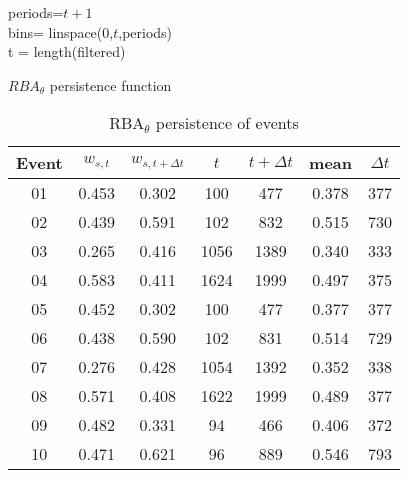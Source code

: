 \begin{algorithm}[!htbp] 
\SetAlgoLined
{}
periods=$t+1$ \\
bins= linspace(0,$t$,periods)  \\
t = length(filtered) \\
\caption{$RBA_\theta$ persistence function}
 \label{algo3}
\end{algorithm}

\begin{table}[!htbp]
\centering
\begin{tabular}{ccccccc} \hline
Event & $w_{s,t}$ &  $w_{s, t+ \Delta t}$  & $t$ & $t + \Delta t$ & mean & $\Delta t$ \\ \hline
01	&	0.453	&	0.302	&	100	&	477	&	0.378	&	377	\\
02	&	0.439	&	0.591	&	102	&	832	&	0.515	&	730	\\
03	&	0.265	&	0.416	&	1056	&	1389	&	0.340	&	333	\\
04	&	0.583	&	0.411	&	1624	&	1999	&	0.497	&	375	\\
05	&	0.452	&	0.302	&	100	&	477	&	0.377	&	377	\\
06	&	0.438	&	0.590	&	102	&	831	&	0.514	&	729	\\
07	&	0.276	&	0.428	&	1054	&	1392	&	0.352	&	338	\\
08	&	0.571	&	0.408	&	1622	&	1999	&	0.489	&	377	\\
09	&	0.482	&	0.331	&	94	&	466	&	0.406	&	372	\\
10	&	0.471	&	0.621	&	96	&	889	&	0.546	&	793	\\
\hline
\end{tabular}
\caption{RBA$_\theta$ persistence of events}
\label{tbl:p-rba}
\end{table}




